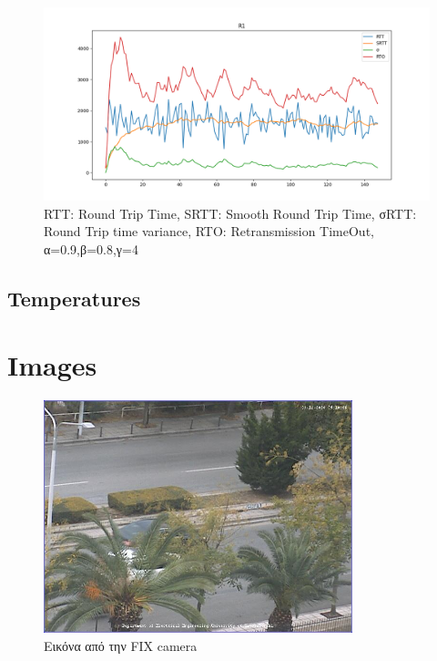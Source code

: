 \documentclass{article}
\begin{document}
\begin{figure}[H]
  \begin{center}
    \includegraphics[width=\textwidth]{R1.png}
  \end{center}
  \caption{RTT: Round Trip Time, SRTT: Smooth Round Trip Time, σ{\tiny{RTT}}:
  Round Trip time variance, RTO: Retransmission TimeOut, α=0.9,β=0.8,γ=4}
\end{figure}

\subsection{Temperatures}


\section{Images}

\begin{figure}[H]
  \begin{center}
    \includegraphics[width=0.8\textwidth]{../../results/session1/E1.jpg}
  \end{center}
  \caption{Εικόνα από την FIX camera}
\end{figure}
\end{document}
